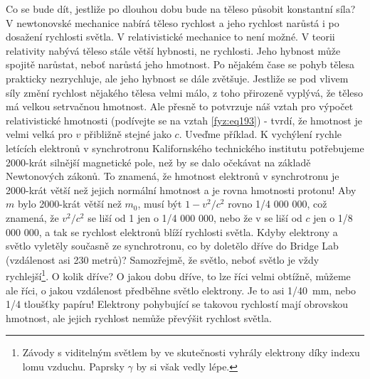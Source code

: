     Co se bude dít, jestliže po dlouhou dobu bude na těleso působit konstantní síla? V newtonovské 
    mechanice nabírá těleso rychlost a jeho rychlost narůstá i po dosažení rychlosti světla. V 
    relativistické mechanice to není možné. V teorii relativity nabývá těleso stále větší hybnosti, 
    ne rychlosti. Jeho hybnost může spojitě narůstat, neboť narůstá jeho hmotnost. Po nějakém čase 
    se pohyb tělesa prakticky nezrychluje, ale jeho hybnost se dále zvětšuje. Jestliže se pod 
    vlivem síly změní rychlost nějakého tělesa velmi málo, z toho přirozeně vyplývá, že těleso má 
    velkou setrvačnou hmotnost. Ale přesně to potvrzuje náš vztah pro výpočet relativistické 
    hmotnosti (podívejte se na vztah \ref{fyz:eq193}) - tvrdí, že hmotnost je velmi velká pro \(v\) 
    přibližně stejné jako \(c\). Uveďme příklad. K vychýlení rychle letících elektronů v 
    synchrotronu Kalifornského technického institutu potřebujeme \num{2000}-krát silnější 
    magnetické pole, než by se dalo očekávat na základě Newtonových zákonů. To znamená, že hmotnost 
    elektronů v synchrotronu je \num{2000}-krát větší než jejich normální hmotnost a je rovna 
    hmotnosti protonu! Aby \(m\) bylo \num{2000}-krát větší než \(m_0\), musí být \(1 - v^2/c^2\) 
    rovno \num{1/4 000 000}, což znamená, že \(v^2/c^2\) se liší od \num{1} jen o \num{1/4 000 
    000}, nebo že v se liší od \(c\) jen o \num{1/8 000 000}, a tak se rychlost elektronů blíží 
    rychlosti světla. Kdyby elektrony a světlo vyletěly současně ze synchrotronu, co by doletělo 
    dříve do Bridge Lab (vzdálenost asi \num{230} metrů)? Samozřejmě, že světlo, neboť světlo je 
    vždy rychlejší\footnote{Závody s viditelným světlem by ve skutečnosti vyhrály elektrony díky 
    indexu lomu vzduchu. Paprsky \(\gamma\) by si však vedly lépe.}. O kolik dříve? O jakou dobu 
    dříve, to lze říci velmi obtížně, můžeme ale říci, o jakou vzdálenost předběhne světlo 
    elektrony. Je to asi \SI{1/40}{\mm}, nebo \num{1/4} tloušťky papíru! Elektrony pohybující se 
    takovou rychlostí mají obrovskou hmotnost, ale jejich rychlost nemůže převýšit rychlost světla.
    
